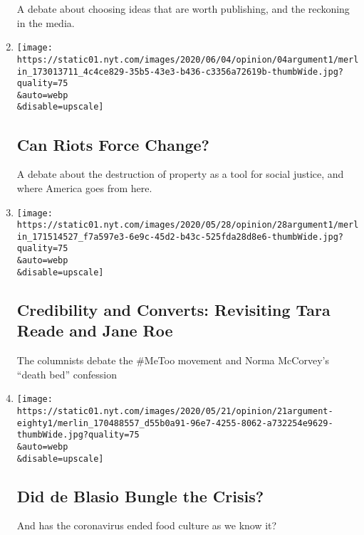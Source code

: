 \begin{enumerate}
  A debate about choosing ideas that are worth publishing, and the
  reckoning in the media.
\item
  \href{/2020/06/04/opinion/the-argument-protest-riot-violence.html}{}

  \texttt{[image: https://static01.nyt.com/images/2020/06/04/opinion/04argument1/merlin\_173013711\_4c4ce829-35b5-43e3-b436-c3356a72619b-thumbWide.jpg?quality=75\\\&auto=webp\\\&disable=upscale]}

  \hypertarget{can-riots-force-change}{%
  \subsection{Can Riots Force Change?}\label{can-riots-force-change}}

  A debate about the destruction of property as a tool for social
  justice, and where America goes from here.
\item
  \href{/2020/05/28/opinion/the-argument-tara-reade-norma-mccorvey.html}{}

  \texttt{[image: https://static01.nyt.com/images/2020/05/28/opinion/28argument1/merlin\_171514527\_f7a597e3-6e9c-45d2-b43c-525fda28d8e6-thumbWide.jpg?quality=75\\\&auto=webp\\\&disable=upscale]}

  \hypertarget{credibility-and-converts-revisiting-tara-reade-and-jane-roe}{%
  \subsection{Credibility and Converts: Revisiting Tara Reade and Jane
  Roe}\label{credibility-and-converts-revisiting-tara-reade-and-jane-roe}}

  The columnists debate the \#MeToo movement and Norma McCorvey's
  ``death bed'' confession
\item
  \href{/2020/05/21/opinion/the-argument-de-blasio-cuomo-coronavirus.html}{}

  \texttt{[image: https://static01.nyt.com/images/2020/05/21/opinion/21argument-eighty1/merlin\_170488557\_d55b0a91-96e7-4255-8062-a732254e9629-thumbWide.jpg?quality=75\\\&auto=webp\\\&disable=upscale]}

  \hypertarget{did-de-blasio-bungle-the-crisis}{%
  \subsection{Did de Blasio Bungle the
  Crisis?}\label{did-de-blasio-bungle-the-crisis}}

  And has the coronavirus ended food culture as we know it?
\end{enumerate}

